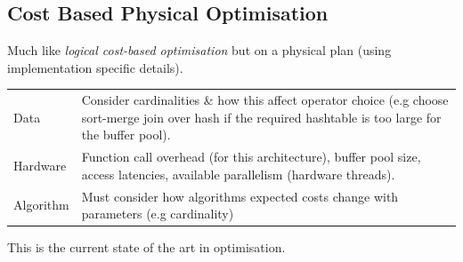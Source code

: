 \subsection{Cost Based Physical Optimisation}
Much like \textit{logical cost-based optimisation} but on a physical plan (using implementation specific details).
\begin{center}
    \begin{tabular}{l p{}}
        Data & Consider cardinalities \& how this affect operator choice (e.g choose sort-merge join over hash if the required hashtable is too large for the buffer pool). \\
        Hardware & Function call overhead (for this architecture), buffer pool size, access latencies, available parallelism (hardware threads). \\
        Algorithm & Must consider how algorithms expected costs change with parameters (e.g cardinality) \\ 
    \end{tabular}
\end{center}
This is the current state of the art in optimisation. 


